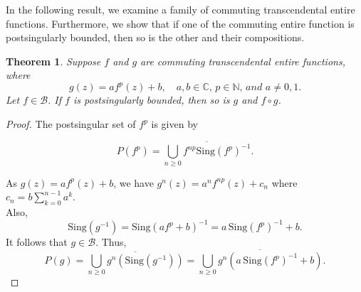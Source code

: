 \documentclass[a4paper,12pt]{amsart}
\numberwithin{equation}{section}
\newtheorem{theorem}{Theorem}[section]
\begin{document}
	In the following result, we examine a family of commuting transcendental entire functions. Furthermore, we show that if one of the commuting entire function is postsingularly bounded, then so is the other and their compositions.
	\begin{theorem} \label{th 2}
		Suppose $f$ and $g$ are commuting transcendental entire functions, where
		\[
		g(z) = a f^p(z) + b, \quad a,b \in \mathbb{C}, \, p\in \mathbb{N},  \, and \,\, a \neq 0,1.
		\]
	Let $f\in \mathcal{B}$.	If $f$ is postsingularly bounded, then so is $g$ and $f \circ g$.
	\end{theorem}
	
	
	\begin{proof} 
		The postsingular set of $f^p$ is given by 
		
		
		\[
		P(f^p) = \overline {\bigcup_{n \geq 0} f^{np} \mathrm{Sing}(f^p)^{-1}  }.
		\]
		
		As $g(z) = af^p(z) + b$, we have $g^n(z)=a^nf^{np}(z)+ c_n$ where $c_n= b \sum_{k=0}^{n-1} a^k$.\\
		Also,
		\[
		\mathrm{Sing}(g^{-1}) = \mathrm{Sing} (af^p + b)^{-1} 
		= a \, \mathrm{Sing}(f^p)^{-1} + b.
		\]
		It follows that $g\in \mathcal{B}$.
		Thus,
		\[
		P(g) = \overline {\bigcup_{n \geq 0} g^n \left( \mathrm{Sing}(g^{-1}) \right)}
		= \overline {\bigcup_{n \geq 0} g^n \left( a \, \mathrm{Sing}(f^p)^{-1} + b \right)}.
		\]
		

\end{proof}
\end{document}
